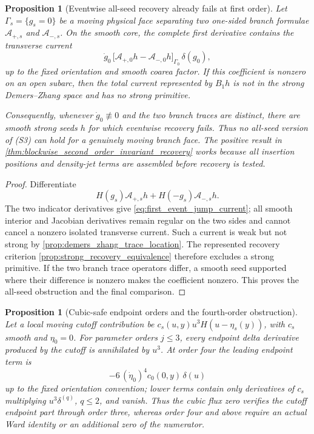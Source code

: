 \documentclass[11pt]{amsart}
\theoremstyle{compactplain}
\newtheorem{proposition}[theorem]{Proposition}
\newtheorem*{proposition*}{Proposition}
\theoremstyle{compactdefinition}
\theoremstyle{compactremark}
\begin{document}
\begin{proposition}[Eventwise all-seed recovery already fails at first order]
\label{prop:eventwise_all_seed_recovery_obstruction}
Let \(\Gamma_s=\{g_s=0\}\) be a moving physical face separating two one-sided
branch formulae \(\mathcal A_{+,s}\) and \(\mathcal A_{-,s}\).  On the smooth
core, the complete first derivative contains the transverse current
\begin{equation}
\label{eq:first_event_jump_current}
 \dot g_0\,\bigl[
   \mathcal A_{+,0}h-\mathcal A_{-,0}h
 \bigr]_{\Gamma_0}\,\delta(g_0),
\end{equation}
up to the fixed orientation and smooth coarea factor.  If this coefficient is
nonzero on an open subarc, then the total current represented by \(B_1h\) is
not in the strong Demers--Zhang space and has no strong primitive.

Consequently, whenever \(\dot g_0\not\equiv0\) and the two branch traces are
distinct, there are smooth strong seeds \(h\) for which eventwise recovery
fails.  Thus no all-seed version of (S3) can hold for a genuinely moving
branch face.  The positive result in
\cref{thm:blockwise_second_order_invariant_recovery} works because all
insertion positions and density-jet terms are assembled before recovery is
tested.
\end{proposition}

\begin{proof}
Differentiate
\[
 H(g_s)\mathcal A_{+,s}h+
 H(-g_s)\mathcal A_{-,s}h.
\]
The two indicator derivatives give
\eqref{eq:first_event_jump_current}; all smooth interior and Jacobian
derivatives remain regular on the two sides and cannot cancel a nonzero
isolated transverse current.  Such a current is weak but not strong by
\cref{prop:demers_zhang_trace_location}.  The represented recovery criterion
\cref{prop:strong_recovery_equivalence} therefore excludes a strong
primitive.  If the two branch trace operators differ, a smooth seed supported
where their difference is nonzero makes the coefficient nonzero.  This proves
the all-seed obstruction and the final comparison.
\end{proof}

\begin{proposition*}[Cubic-safe endpoint orders and the fourth-order obstruction]
Let a local moving cutoff contribution be
\(c_s(u,y)u^3H(u-\eta_s(y))\), with \(c_s\) smooth and \(\eta_0=0\).
For parameter orders \(j\le3\), every endpoint delta derivative produced by
the cutoff is annihilated by \(u^3\).  At order four the leading endpoint term
is
\begin{equation}
\label{eq:fourth_order_endpoint_obstruction}
 -6\,(\dot\eta_0)^4c_0(0,y)\,\delta(u)
\end{equation}
up to the fixed orientation convention; lower terms contain only derivatives
of \(c_s\) multiplying \(u^3\delta^{(q)}\), \(q\le2\), and vanish.  Thus the
cubic flux zero verifies the cutoff endpoint part through order three, whereas
order four and above require an actual Ward identity or an additional zero of
the numerator.
\end{proposition*}
\end{document}

